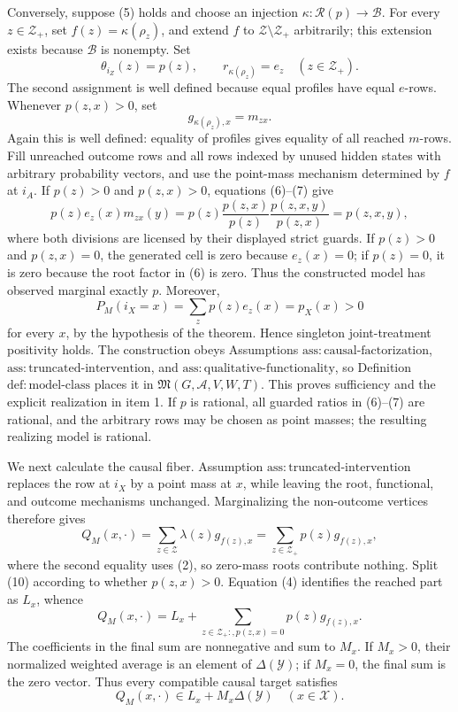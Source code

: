 Conversely, suppose (5) holds and choose an injection
\(\kappa:\mathcal R(p)\to\mathcal B\).  For every
\(z\in\mathcal Z_+\), set \(f(z)=\kappa(\rho_z)\), and extend \(f\) to
\(\mathcal Z\setminus\mathcal Z_+\) arbitrarily; this extension exists
because \(\mathcal B\) is nonempty.  Set
\[
 \theta_{i_Z}(z)=p(z),
 \qquad
 r_{\kappa(\rho_z)}=e_z
 \quad(z\in\mathcal Z_+).
\tag{6}
\]
The second assignment is well defined because equal profiles have equal
\(e\)-rows.  Whenever \(p(z,x)>0\), set
\[
 g_{\kappa(\rho_z),x}=m_{zx}.
\tag{7}
\]
Again this is well defined: equality of profiles gives equality of all
reached \(m\)-rows.  Fill unreached outcome rows and all rows indexed by
unused hidden states with arbitrary probability vectors, and use the
point-mass mechanism determined by \(f\) at \(i_A\).  If \(p(z)>0\) and
\(p(z,x)>0\), equations (6)--(7) give
\[
 p(z)e_z(x)m_{zx}(y)
 =p(z)\frac{p(z,x)}{p(z)}
       \frac{p(z,x,y)}{p(z,x)}
 =p(z,x,y),
\tag{8}
\]
where both divisions are licensed by their displayed strict guards.  If
\(p(z)>0\) and \(p(z,x)=0\), the generated cell is zero because
\(e_z(x)=0\); if \(p(z)=0\), it is zero because the root factor in (6)
is zero.  Thus the constructed model has observed marginal exactly
\(p\).  Moreover,
\[
 P_M(i_X=x)=\sum_zp(z)e_z(x)=p_X(x)>0
\tag{9}
\]
for every \(x\), by the hypothesis of the theorem.  Hence singleton
joint-treatment positivity holds.  The construction obeys Assumptions
\(\mathrm{ass:causal\text{-}factorization}\),
\(\mathrm{ass:truncated\text{-}intervention}\), and
\(\mathrm{ass:qualitative\text{-}functionality}\), so Definition
\(\mathrm{def:model\text{-}class}\) places it in
\(\mathfrak M(G,\mathcal A,V,W,T)\).  This proves sufficiency and the
explicit realization in item 1.  If \(p\) is rational, all guarded ratios
in (6)--(7) are rational, and the arbitrary rows may be chosen as point
masses; the resulting realizing model is rational.

We next calculate the causal fiber.  Assumption
\(\mathrm{ass:truncated\text{-}intervention}\) replaces the row at
\(i_X\) by a point mass at \(x\), while leaving the root, functional, and
outcome mechanisms unchanged.  Marginalizing the non-outcome vertices
therefore gives
\[
 Q_M(x,\cdot)
 =\sum_{z\in\mathcal Z}\lambda(z)g_{f(z),x}
 =\sum_{z\in\mathcal Z_+}p(z)g_{f(z),x},
\tag{10}
\]
where the second equality uses (2), so zero-mass roots contribute nothing.
Split (10) according to whether \(p(z,x)>0\).  Equation (4) identifies
the reached part as \(L_x\), whence
\[
 Q_M(x,\cdot)
 =L_x+\sum_{z\in\mathcal Z_+:,p(z,x)=0}
       p(z)g_{f(z),x}.
\tag{11}
\]
The coefficients in the final sum are nonnegative and sum to \(M_x\).
If \(M_x>0\), their normalized weighted average is an element of
\(\Delta(\mathcal Y)\); if \(M_x=0\), the final sum is the zero vector.
Thus every compatible causal target satisfies
\[
 Q_M(x,\cdot)\in L_x+M_x\Delta(\mathcal Y)
\quad(x\in\mathcal X).
\tag{12}
\]

